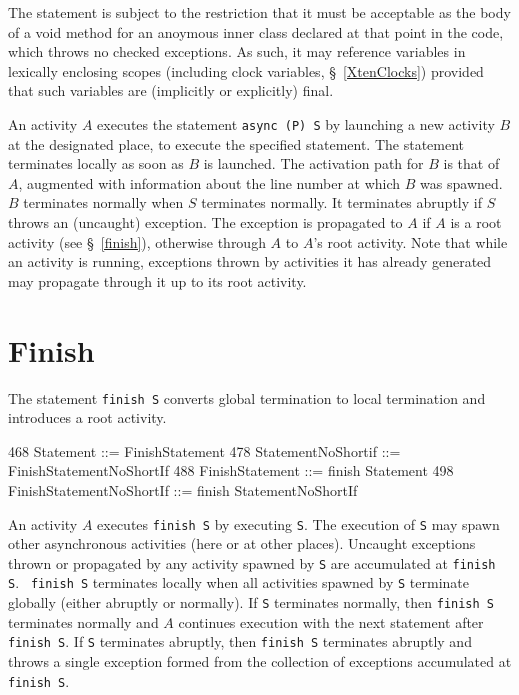 The statement is subject to the restriction that it must be acceptable
as the body of a {\cf void} method for an anoymous inner class
declared at that point in the code, which throws no checked
exceptions. As such, it may reference variables in lexically enclosing
scopes (including {\cf clock} variables, \S~\ref{XtenClocks}) provided
that such variables are (implicitly or explicitly) {\cf final}.

An activity $A$ executes the statement {\tt async (P) S} by launching
a new activity $B$ at the designated place, to execute the specified
statement. The statement terminates locally as soon as $B$ is
launched.  The activation path for $B$ is that of $A$, augmented with
information about the line number at which $B$ was spawned.  $B$
terminates normally when $S$ terminates normally.  It terminates
abruptly if $S$ throws an (uncaught) exception. The exception is
propagated to $A$ if $A$ is a root activity (see
\S~\ref{finish}), otherwise through $A$ to $A$'s root
activity. Note that while an activity is running, exceptions thrown by
activities it has already generated may propagate through it up to its
root activity.

\section{Finish}\label{finish}
The statement {\tt finish S} converts global termination to local
termination and introduces a root activity. 
\begin{x10}
468 Statement ::= FinishStatement
478 StatementNoShortif ::= FinishStatementNoShortIf
488 FinishStatement ::= finish Statement
498 FinishStatementNoShortIf ::= finish StatementNoShortIf
\end{x10}

An activity $A$ executes {\tt finish S} by executing {\tt S}.  The
execution of {\tt S} may spawn other asynchronous activities (here or
at other places).  Uncaught exceptions thrown or propagated by any
activity spawned by {\tt S} are accumulated at {\tt finish S}.  {\tt
finish S} terminates locally when all activities spawned by {\tt S}
terminate globally (either abruptly or normally). If
{\tt S} terminates normally, then {\tt finish S} terminates normally
and $A$ continues execution with the next statement after {\tt finish S}.
If {\tt S} terminates abruptly, then {\tt finish S}
terminates abruptly and throws a single exception formed 
from the collection of exceptions accumulated at {\tt finish S}.

